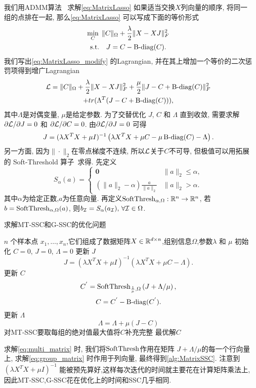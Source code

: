 我们用ADMM算法~\cite{stephen2011distributed} 求解\eqref{eq:MatrixLasso} 
如果适当交换\(X\)列向量的顺序, 将同一组的点排在一起, 
那么\eqref{eq:MatrixLasso} 可以写成下面的等价形式
\begin{equation}\label{eq:MatrixLasso_modify}
  \begin{gathered}
    \min_{C} \; \|C\|_{\Omega}+\frac{\lambda}{2}\|X-XJ\|_F^2 \\
    \text{s.t.} \quad J=C-\operatorname{B-diag}(C).
  \end{gathered}
\end{equation}
我们写出\eqref{eq:MatrixLasso_modify} 的Lagrangian,
并在其上增加一个等价的二次惩罚项得到增广Lagrangian
\begin{multline*}
  \mathcal{L}= \|C\|_{\Omega}+\frac{\lambda}{2}\|X-XJ\|_F^2 
  +\frac{\mu}{2}\|J-C+\operatorname{B-diag}(C)\|_F^2\\
  +tr(\Lambda^T(J-C+\operatorname{B-diag}(C))),
\end{multline*}
其中\(\Lambda\)是对偶变量, \(\mu\)是给定参数. 为了交替优化
\(J\), \(C\) 和 \(\Lambda\) 直到收敛, 需要求解 \(\partial \mathcal{L}/\partial J=0\)
和 \(\partial \mathcal{L}/\partial C=0\). 由\(\partial \mathcal{L}/\partial J=0\) 可得
\[
  J=(\lambda X^TX+\mu I)^{-1}\left(\lambda X^TX+\mu C - 
  \mu\operatorname{B-diag}(C)-\Lambda\right).
\]
另一方面, 因为\(\|\cdot\|_2\)在零点梯度不连续,
所以\(\mathcal{L}\)关于\(C\)不可导, 但极值可以用拓展的
Soft-Threshold 算子~\cite{donoho1995noising}求得.
先定义
\begin{equation*}
  S_\alpha(a) = \begin{cases}
    \mathbf{0} & \|a\|_2 \le \alpha, \\
    (\|a\|_2 - \alpha) \frac{a}{\|a\|_2} & \|a\|_2 > \alpha.
  \end{cases}
\end{equation*}
其中\(\alpha\)为给定正数,\(a\)为任意向量.
再定义\(\operatorname{SoftThresh}_{\alpha,\Omega}:\mathbb{R}^n\rightarrow \mathbb{R}^n\), 若
\(b =\operatorname{SoftThresh}_{\alpha,\Omega}(a)\), 则\( b_{\mathcal{I}}= S_\alpha(a_{\mathcal{I}}),
\, \forall \mathcal{I} \in \Omega\).

\begin{algorithm}[tb]
  \caption{求解MT-SSC和G-SSC的优化问题}
  \label{alg:MatrixSSC}
  \begin{algorithmic}
    \(n\) 个样本点 \(x_1,\ldots,x_n\),它们组成了数据矩阵\(X\in \mathbb{R}^{d\times
    n}\),组别信息\(\Omega\),参数\(\lambda\) 和 \(\mu\)
    \State 初始化 \(C=0\), \(J=0\), \(\Lambda=0\)
     更新 \(J\) 
    \[J=(\lambda X^TX+\mu I)^{-1}(\lambda X^TX+\mu C-\Lambda).\]
     更新 \(C\)
    \[ C^{'}=\operatorname{SoftThresh}_{\frac{1}{\mu},\Omega}\left(J+\Lambda/\mu\right), \]
    \[ C=C^{'}-\operatorname{B-diag}(C^{'}).\]
     更新 \(\Lambda\)
    \[\Lambda=\Lambda+\mu(J-C)\]
    \EndWhile
    \State 对MT-SSC要取每组的绝对值最大值将\(C\)补充完整
     最优解\(C\)
  \end{algorithmic}
\end{algorithm}
求解\eqref{eq:multi_matrix} 时, 我们将\(\operatorname{SoftThresh}\)作用在矩阵
\(J+\Lambda/\mu\)的每一个行向量上,
求解\eqref{eq:group_matrix} 时作用于列向量,
最终得到\autoref{alg:MatrixSSC}.
注意到 \((\lambda X^TX+\mu I)^{-1}\)
能被预先算好,这样每次迭代的时间就主要花在计算矩阵乘法上,
因此MT-SSC,G-SSC花在优化上的时间和SSC几乎相同.
